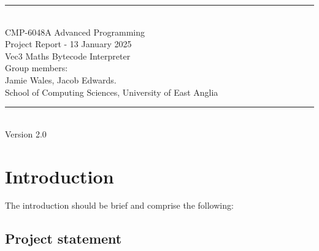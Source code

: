 \documentclass[a4paper, oneside, 11pt]{report}
\begin{document}
\begin{titlepage}
\begin{center}
\rule{12cm}{1mm} \\
\vspace{1cm}
{\large  CMP-6048A Advanced Programming} %
\vspace{7.5cm}
\\{\Large Project Report - 13 January 2025}
\vspace{1.5cm}
\\{\LARGE Vec3 Maths Bytecode Interpreter} %
\vspace{1.0cm}
\\{\Large Group members: \\ Jamie Wales, Jacob Edwards.\ }
\vspace{10.0cm}
\\{\large School of Computing Sciences, University of East Anglia}
\\ \rule{12cm}{0.5mm}
\\ \hspace{8.5cm} {\large Version 2.0}
\end{center}
\end{titlepage}


\setcounter{page}{1}

\begin{abstract}
Vec3 is a bytecode interpreted maths language complete with a GUI, plotting, full static type inference and various 
maths functions.

The language is designed to be simple to use and understand, with a focus on strict mathematical expressions and 
plotting, but with more powerful constructs such as recursive bindings, first class functions and static type inference.

The language and GUI are written in F\#.
\end{abstract}

\chapter{Introduction}\label{ch:intro}

The introduction should be brief and comprise the following:

\section{Project statement}\label{sec:project-statement}
\end{document}
